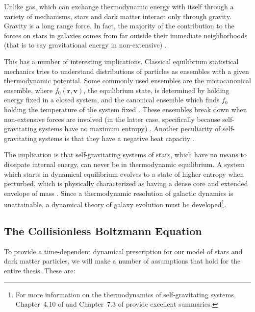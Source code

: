 Unlike gas, which can exchange thermodynamic energy with itself through a variety of mechanisms, stars and dark matter interact only through gravity. Gravity is a long range force. In fact, the majority of the contribution to the forces on stars in galaxies comes from far outside their immediate neighborhoods (that is to say gravitational energy in non-extensive) \citep{BT}. 

This has a number of interesting implications. Classical equilibrium statistical mechanics tries to understand distributions of particles as ensembles with a given thermodynamic potential. Some commonly used ensembles are the microcanonical ensemble, where $f_0(\textbf{r},\textbf{v})$, the equilibrium state, is determined by holding energy fixed in a closed system, and the canonical ensemble which finds $f_0$ holding the temperature of the system fixed \citep{sethna}. These ensembles break down when non-extensive forces are involved (in the latter case, specifically because self-gravitating systems have no maximum entropy) \citep{self_gravitating_statistical_mechanics,lb_negative_specific_heat, BT}. Another peculiarity of self-gravitating systems is that they have a negative heat capacity \citep{lb_negative_specific_heat}.

The implication is that self-gravitating systems of stars, which have no means to dissipate internal energy, can never be in thermodynamic equilibrium. A system which starts in dynamical equilibrium evolves to a state of higher entropy when perturbed, which is physically characterized as having a dense core and extended envelope of mass \citep{BT}. Since a thermodynamic resolution of galactic dynamics is unattainable, a dynamical theory of galaxy evolution must be developed\footnote{For more information on the thermodynamics of self-gravitating systems, Chapter~4.10 of \citet{BT} and Chapter~7.3 of \citet{BT} provide excellent summaries.}.

\subsection{The Collisionless Boltzmann Equation}

To provide a time-dependent dynamical prescription for our model of stars and dark matter particles, we will make a number of assumptions that hold for the entire thesis. These are:

